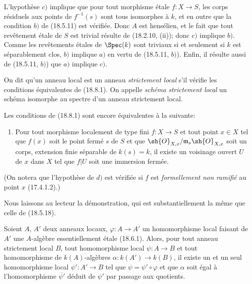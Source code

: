 L'hypothèse $c)$ implique que pour tout morphisme étale $f:X\to S$, les corps résiduels aux points de $f^{-1}(s)$ sont tous isomorphes à $k$, et en outre que la condition $b)$ de (18.5.11) est vérifiée. Donc $A$ est hensélien, et le fait que tout revêtement étale de $S$ est trivial résulte de (18.2.10, (ii)); donc $c)$ implique $b)$. Comme les revêtements étales de $\Spec(k)$ sont triviaux si et seulement si $k$ est séparablement clos, $b)$ implique $a)$ en vertu de (18.5.11, $b)$). Enfin, il résulte aussi de (18.5.11, $b)$) que $a)$ implique $c)$.

\begin{definition}[18.8.2]
On dit qu'un anneau local est un anneau \emph{strictement local} s'il vérifie les conditions équivalentes de (18.8.1). On appelle \emph{schéma strictement local} un schéma isomorphe au spectre d'un anneau strictement local.
\end{definition}

\begin{remark}[18.8.3]
\label{IV.18.8.3}
Les conditions de (18.8.1) sont encore équivalentes à la suivante:
\begin{enumerate}
  \item[$d)$] Pour tout morphisme localement de type fini $f:X\to S$ et tout point $x\in X$ tel que $f(x)$ soit le point fermé $s$ de $S$ et que $\sh{O}_{X,x}/\mathfrak m_s\sh{O}_{X,x}$ soit un corps, extension finie séparable de $k(s)=k$, il existe un voisinage ouvert $U$ de $x$ dans $X$ tel que $f|U$ soit une immersion fermée.
\end{enumerate}
\end{remark}


(On notera que l'hypothèse de $d)$ est vérifiée si $f$ est \emph{formellement non ramifié} au point $x$ (17.4.1.2).)

Nous laissons au lecteur la démonstration, qui est substantiellement la même que celle de (18.5.18).

\begin{lemma}[18.8.4]
\label{IV.18.8.4}
Soient $A$, $A'$ deux anneaux locaux, $\varphi:A\to A'$ un homomorphisme local faisant de $A'$ une $A$-algèbre essentiellement étale (18.6.1). Alors, pour tout anneau strictement local $B$, tout homomorphisme local $\psi:A\to B$ et tout homomorphisme de $k(A)$-algèbres $\alpha:k(A')\to k(B)$, il existe un et un seul homomorphisme local $\psi':A'\to B$ tel que $\psi=\psi'\circ\varphi$ et que $\alpha$ soit égal à l'homomorphisme $\overline{\psi'}$ déduit de $\psi'$ par passage aux quotients.
\end{lemma}

